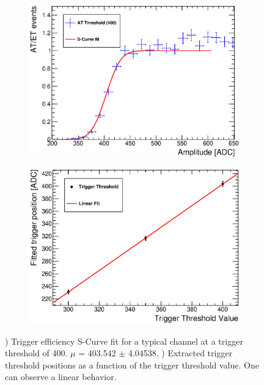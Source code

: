 \begin{figure}[htbp!]
  \centering
  \begin{subfigure}[t]{0.49\textwidth}
    \includegraphics[width=1.\linewidth]{../Thesis_Plots/Commissioning/Plots/EfficiencyCurveFit_HBU2_12.eps}
    \caption{} \label{fig:EffiCurve}
  \end{subfigure}
  \hfill
  \begin{subfigure}[t]{0.49\textwidth}
    \includegraphics[width=1.\linewidth]{../Thesis_Plots/Commissioning/Plots/TriggerThresholdFit_HBU2_12.eps}
    \caption{} \label{fig:TriggerFit}
  \end{subfigure}
  \caption{) Trigger efficiency S-Curve fit for a typical channel at a trigger threshold of 400. $\mu$ = 403.542 $\pm$ 4.04538. ) Extracted trigger threshold positions as a function of the trigger threshold value. One can observe a linear behavior.}
\end{figure}

